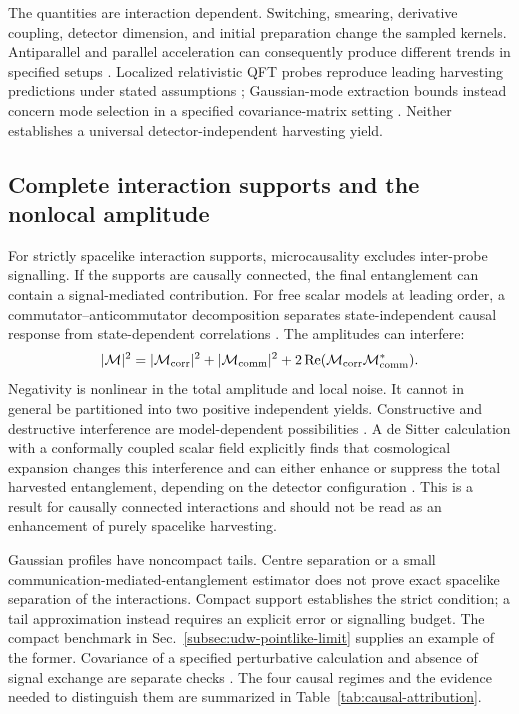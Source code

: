 \documentclass[pdflatex,sn-mathphys-num]{sn-jnl}
\begin{document}
The quantities are interaction dependent. Switching, smearing, derivative coupling, detector dimension, and initial preparation change the sampled kernels. Antiparallel and parallel acceleration can consequently produce different trends in specified setups \cite{SaltonMannMenicucci2015}. Localized relativistic QFT probes reproduce leading harvesting predictions under stated assumptions \cite{Perche2024}; Gaussian-mode extraction bounds instead concern mode selection in a specified covariance-matrix setting \cite{Torres2023}. Neither establishes a universal detector-independent harvesting yield.

\subsection{Complete interaction supports and the nonlocal amplitude}
For strictly spacelike interaction supports, microcausality excludes inter-probe signalling. If the supports are causally connected, the final entanglement can contain a signal-mediated contribution. For free scalar models at leading order, a commutator--anticommutator decomposition separates state-independent causal response from state-dependent correlations \cite{Tjoa2021}. The amplitudes can interfere:
\begin{equation}
|\mathcal M|^2=|\mathcal M_{\rm corr}|^2+|\mathcal M_{\rm comm}|^2
+2\operatorname{Re}(\mathcal M_{\rm corr}\mathcal M_{\rm comm}^*).
\label{eq:harvesting-communication-interference}
\end{equation}
Negativity is nonlinear in the total amplitude and local noise. It cannot in general be partitioned into two positive independent yields. Constructive and destructive interference are model-dependent possibilities \cite{Zambianco2024,Zambianco2026}. A de Sitter calculation with a conformally coupled scalar field explicitly finds that cosmological expansion changes this interference and can either enhance or suppress the total harvested entanglement, depending on the detector configuration \cite{Zambianco2024,Zambianco2026}. This is a result for causally connected interactions and should not be read as an enhancement of purely spacelike harvesting.

Gaussian profiles have noncompact tails. Centre separation or a small communication-mediated-entanglement estimator does not prove exact spacelike separation of the interactions. Compact support establishes the strict condition; a tail approximation instead requires an explicit error or signalling budget. The compact benchmark in Sec.~\ref{subsec:udw-pointlike-limit} supplies an example of the former. Covariance of a specified perturbative calculation and absence of signal exchange are separate checks \cite{MaesoGarcia2022}. The four causal regimes and the evidence needed to distinguish them are summarized in Table~\ref{tab:causal-attribution}.
\end{document}
